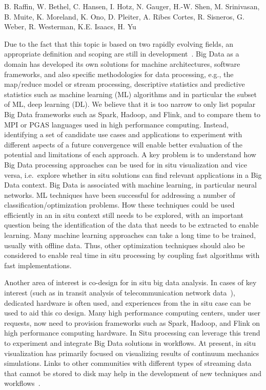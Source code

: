 \license

 B. Raffin, W. Bethel, C. Hansen, I. Hotz, N. Gauger, H.-W. Shen, M. Srinivasan, B. Muite, K. Moreland, K. Ono, D. Pleiter, A. Ribes Cortes, R. Sisneros, G. Weber, R. Westerman, K.E. Isaacs, H. Yu

\begin{refsection}
\label{sec:BigData}
Due to the fact that this topic is based on two rapidly evolving fields, an appropriate definition and scoping are still in development~\cite{Asch18}. 
Big Data as a domain has developed its own solutions for machine architectures, software frameworks, and also specific methodologies for data processing, e.g., the map/reduce model or stream processing, descriptive statistics and predictive statistics such as machine learning (ML) algorithms and in particular the subset of ML, deep learning (DL). 
We believe that it is too narrow to only list popular Big Data frameworks such as Spark, Hadoop, and Flink, and to compare them to MPI or PGAS languages used in high performance computing.
Instead, identifying a set of candidate use cases and applications to experiment with different aspects of a future convergence will enable better evaluation of the potential and limitations of each approach. 
A key problem is to understand how Big Data processing approaches can be used for in situ visualization and vice versa, i.e.~explore whether in situ solutions can find relevant applications in a Big Data context.
Big Data is associated with machine learning, in particular neural networks. 
ML techniques have been successful for addressing a number of classification/optimization problems. 
How these techniques could be used efficiently in an in situ context still needs to be explored, with an important question being the identification of the data that needs to be extracted to enable learning.  
Many machine learning approaches can take a long time to be trained, usually with offline data. 
Thus, other optimization techniques should also be considered to enable real time in situ processing by coupling fast algorithms with fast implementations.

Another area of interest is co-design for in situ big data analysis. 
In cases of key interest (such as in transit analysis of telecommunication network data~\cite{Grosman16}), dedicated hardware is often used, and experiences from the in situ case can be used to aid this co design.  
Many high performance computing centers, under user requests, now need to provision frameworks such as Spark, Hadoop, and Flink on high performance computing hardware. 
In Situ processing can leverage this trend to experiment and integrate Big Data solutions in workflows. 
At present, in situ visualization has primarily focused on visualizing results of continuum mechanics simulations.
Links to other communities with different types of streaming data that cannot be stored to disk may help in the development of new techniques and workflows~\cite{Asch18,Grosman16}.


\end{refsection}
